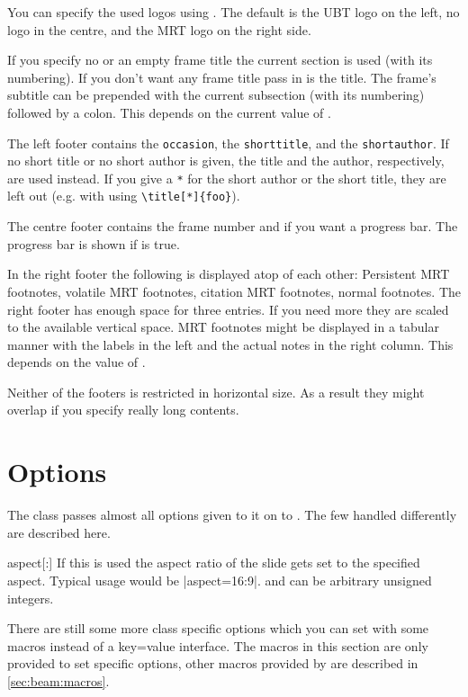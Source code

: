 You can specify the used logos using . The default is the UBT logo
on the left, no logo in the centre, and the MRT logo on the right side.

If you specify no or an empty frame title the current section is used (with its
numbering). If you don't want any frame title pass in  is the title.
The frame's subtitle can be prepended with the current subsection (with its
numbering) followed by a colon. This depends on the current value of
.

The left footer contains the \texttt{occasion}, the \texttt{shorttitle}, and the
\texttt{shortauthor}. If no short title or no short author is given, the title
and the author, respectively, are used instead. If you give a \texttt{*} for the
short author or the short title, they are left out (e.g. with using
\verb|\title[*]{foo}|).

The centre footer contains the frame number and if you want a progress bar. The
progress bar is shown if  is true.

In the right footer the following is displayed atop of each other: Persistent
MRT footnotes, volatile MRT footnotes, citation MRT footnotes, normal footnotes.
The right footer has enough space for three entries. If you need more they are
scaled to the available vertical space. MRT footnotes might be displayed in a
tabular manner with the labels in the left and the actual notes in the right
column. This depends on the value of .

Neither of the footers is restricted in horizontal size. As a result they might
overlap if you specify really long contents.

\section{Options}
The class passes almost all options given to it on to . The few
handled differently are described here.

\begin{describeopt}{aspect}[:]
  If this is used the aspect ratio of the slide gets set to the specified
  aspect. Typical usage would be |aspect=16:9|.  and 
  can be arbitrary unsigned integers.
\end{describeopt}



There are still some more class specific options which you can set with some
macros instead of a key=value interface. The macros in this section are only
provided to set specific options, other macros provided by  are
described in \autoref{sec:beam:macros}.

